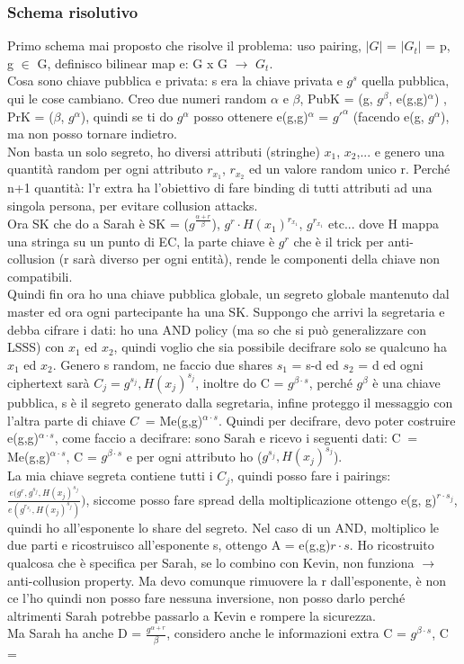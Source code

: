 \documentclass[16px]{article}
\begin{document}
\subsubsection{Schema risolutivo}
Primo schema mai proposto che risolve il problema: uso pairing, $|G|$ = $|G_t|$ = p, g $\in$ G, definisco bilinear map e: G x G $\rightarrow$ $G_t$.\\ Cosa sono chiave pubblica e privata: s era la chiave privata e $g^s$ quella pubblica, qui le cose cambiano. Creo due numeri random $\alpha$ e $\beta$, PubK = (g, $g^{\beta}$, e(g,g)$^{\alpha}$) , PrK = ($\beta$, $g^{\alpha}$), quindi se ti do $g^{\alpha}$ posso ottenere e(g,g)$^{\alpha}$ = $g'^{\alpha}$ (facendo e(g, $g^{\alpha}$), ma non posso tornare indietro.\\ Non basta un solo segreto, ho diversi attributi (stringhe) $x_1$, $x_2$,... e genero una quantità random per ogni attributo $r_{x_1}$, $r_{x_2}$ ed un valore random unico r. Perché n+1 quantità: l'r extra ha l'obiettivo di fare binding di tutti attributi ad una singola persona, per evitare collusion attacks.\\ Ora SK che do a Sarah è SK = ($g^{\frac{\alpha + r}{\beta}}$), $g^r\cdot H(x_1)^{r_{x_1}}$, $g^{r_{x_1}}$ etc... dove H mappa una stringa su un punto di EC, la parte chiave è $g^r$ che è il trick per anti-collusion (r sarà diverso per ogni entità), rende le componenti della chiave non compatibili.\\ Quindi fin ora ho una chiave pubblica globale, un segreto globale mantenuto dal master ed ora ogni partecipante ha una SK. Suppongo che arrivi la segretaria e debba cifrare i dati: ho una AND policy (ma so che si può generalizzare con LSSS) con $x_1$ ed $x_2$, quindi voglio che sia possibile decifrare solo se qualcuno ha $x_1$ ed $x_2$. Genero s random, ne faccio due shares $s_1$ = s-d ed $s_2$ = d ed ogni ciphertext sarà $C_j = g^{s_j}, H(x_j)^{s_j}$, inoltre  do C = $g^{\beta\cdot s}$, perché $g^{\beta}$ è una chiave pubblica, s è il segreto generato dalla segretaria, infine proteggo il messaggio con l'altra parte di chiave $C^{~}$ = Me(g,g)$^{\alpha\cdot s}$. Quindi per decifrare, devo poter costruire e(g,g)$^{\alpha\cdot s}$, come faccio a decifrare: sono Sarah e ricevo i seguenti dati: C$^{~}$ = Me(g,g)$^{\alpha\cdot s}$, C = $g^{\beta\cdot s}$ e per ogni attributo ho ($g^{s_j}, H(x_j)^{s_j}$).\\ La mia chiave segreta contiene tutti i $C_j$, quindi posso fare i pairings: $\frac{e(g^r, g^{s_j}, H(x_j)^{s_j}}{e(g^{r_{x_j}}, H(x_j)^{s_j})})$, siccome posso fare spread della moltiplicazione ottengo e(g, g)$^{r\cdot s_j}$, quindi ho all'esponente lo share del segreto. Nel caso di un AND, moltiplico le due parti e ricostruisco all'esponente s, ottengo A = e(g,g)${r\cdot s}$. Ho ricostruito qualcosa che è specifica per Sarah, se lo combino con Kevin, non funziona $\rightarrow$ anti-collusion property. Ma devo comunque rimuovere la r dall'esponente, è non ce l'ho quindi non posso fare nessuna inversione, non posso darlo perché altrimenti Sarah potrebbe passarlo a Kevin e rompere la sicurezza.\\ Ma Sarah ha anche D = $\frac{g^{\alpha + r}}{\beta}$, considero anche le informazioni extra C = $g^{\beta\cdot s}$, C$^{~}$ = 
\end{document}
